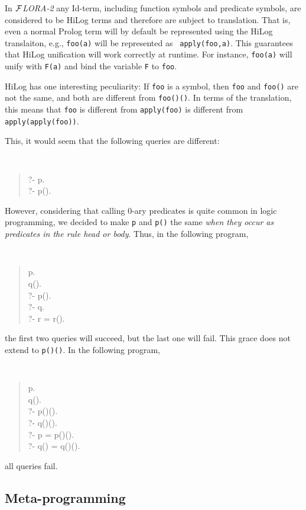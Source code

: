 \documentclass[11pt]{article}
\newcommand{\FLORA}{{\mbox{${\cal F}${\small\it LORA}\rm\emph{-2}}}\xspace}
\begin{document}
In \FLORA any Id-term, including function symbols and predicate symbols,
are considered to be HiLog terms and therefore are subject to translation.
That is, even a normal Prolog term will by default be represented using the
HiLog translaiton, e.g., {\tt foo(a)} will be represented as {\tt
  apply(foo,a)}. This guarantees that HiLog unification will work correctly
at runtime. For instance, {\tt foo(a)} will unify with {\tt F(a)} and bind
the variable {\tt F} to {\tt foo}.


%
HiLog has one interesting peculiarity: If {\tt foo}  is a symbol,
then {\tt foo} and {\tt foo()} are not the same, and both are different
from {\tt foo()()}. In terms of the translation, this means that {\tt foo}
is different from {\tt apply(foo)} is different from {\tt apply(apply(foo))}.

This, it would seem that the following queries are different:
{\tt
\begin{quote}
   ?- p.\\
   ?- p().
\end{quote}
}
\noindent
However, considering that calling 0-ary predicates is quite common in logic
programming, we decided to make {\tt p} and {\tt p()} the same {\em when
  they occur as predicates in the rule head or body}. Thus, in the following
program,
{\tt
\begin{quote}
 p. \\
 q().\\
 ?- p().\\
 ?- q.\\
 ?- r = r().
\end{quote}
}
\noindent
the first two queries will succeed, but the last one will fail.
This grace does not extend to {\tt p()()}. In the following program,
{\tt
\begin{quote}
 p.\\
 q().\\
 ?- p()().\\
 ?- q()().\\
 ?- p = p()().\\
 ?- q() = q()().
\end{quote}
}
\noindent
all queries fail.


\subsection{Meta-programming}
\end{document}
